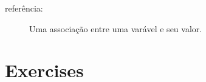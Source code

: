 \begin{description}
\item[referência:] Uma associação entre uma varável e seu valor.












\end{description}


\section{Exercises}

